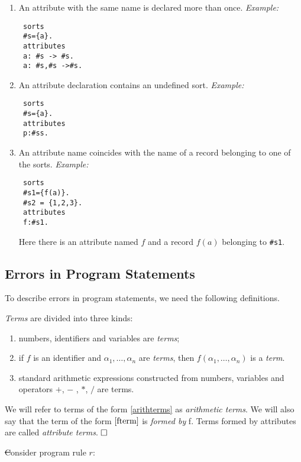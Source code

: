 \documentclass[12pt, letterpaper]{article}
\begin{document}
\begin{enumerate}
\item An attribute with the same name is declared more than once.
\textit{Example:}
\begin{verbatim}
 sorts
 #s={a}.
 attributes
 a: #s -> #s.
 a: #s,#s ->#s.
\end{verbatim}
\item An attribute declaration contains an undefined sort.
\textit{Example:}
\begin{verbatim}
 sorts
 #s={a}.
 attributes
 p:#ss.
\end{verbatim}

\item An attribute name coincides with the name of a record belonging to one of the sorts.
\textit{Example:}
\begin{verbatim}
 sorts
 #s1={f(a)}.
 #s2 = {1,2,3}.
 attributes
 f:#s1.
\end{verbatim}
Here there is an attribute named $f$ and a record $f(a)$ belonging to \texttt{\#s1}.
\end{enumerate}
\subsection{Errors in Program Statements}\label{errorsinstatements}

To describe errors in program statements, we need the following definitions.

\begin{definition}[Term]
{\rm \textit{Terms} are divided into three kinds:
\begin{enumerate}[label=(\arabic*),itemsep=5pt]
 \item numbers, identifiers and variables are \textit{terms};
 \item\label{fterm} if $f$ is an identifier and $\alpha_1, \dots, \alpha_n$ are \textit{terms}, 
   then $f(\alpha_1,\dots, \alpha_n)$ is a \textit{term}.
 \item\label{arithterms} standard arithmetic expressions constructed from numbers, variables and operators $+$, $-$ , $*$, $/$ are terms. 
\end{enumerate}
\noindent
We will refer to terms of the form \ref{arithterms} as \textit{arithmetic terms}.
We will also say that the term of the form $\ref{fterm}$ is \textit{formed by} f. 
Terms formed by attributes are called \textit{attribute terms}.
$\hfill \Box$
}
\end{definition}

\st
Consider  program rule $r$:
  
\end{document}
